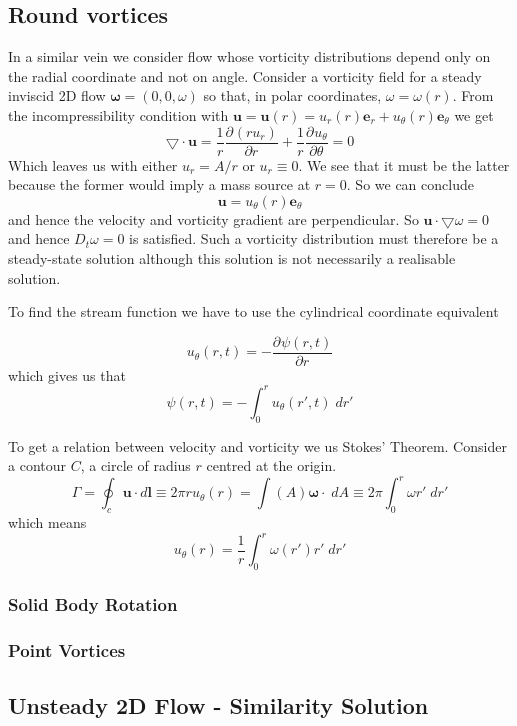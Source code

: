 \documentclass[11pt]{article}
\newcommand*{\pd}[3][]{\ensuremath{\frac{\partial^{#1} {#2}}{\partial {#3}^{#1}}}}
\newcommand{\grad}{\bigtriangledown}
\newcommand{\mv}[1]{\bm{#1}}
\newenvironment{formula}
	{\begin{mdframed}[backgroundcolor=white, roundcorner=5pt, linewidth=1pt, linecolor=red]}
	{\end{mdframed}}
\begin{document}
\subsection{Round vortices}
In a similar vein we consider flow whose vorticity distributions depend only on the radial coordinate and not on angle.
Consider a vorticity field for a steady inviscid 2D flow $\mv{\omega}= (0, 0, \omega)$ so that, in polar coordinates, $\omega=\omega(r)$.
From the incompressibility condition with $\mv{u}=\mv{u}(r)=u_r(r)\mv{e}_r + u_\theta(r)\mv{e}_\theta$ we get
\[
	\grad\cdot\mv{u} = \frac{1}{r}\pd{(ru_r)}{r}+\frac{1}{r}\pd{u_\theta}{\theta}=0
\]
Which leaves us with either $u_r=A/r$ or $u_r\equiv 0$.
We see that it must be the latter because the former would imply a mass source at $r=0$.
So we can conclude
\[
	\mv{u} = u_\theta(r) \mv{e}_\theta
\]
and hence the velocity and vorticity gradient are perpendicular.
So $\mv{u}\cdot\grad\omega = 0$ and hence $D_t\omega = 0$ is satisfied.
Such a vorticity distribution must therefore be a steady-state solution although this solution is not necessarily a realisable solution.

To find the stream function we have to use the cylindrical coordinate equivalent
\begin{formula}
	\[
		u_\theta(r, t) = - \pd{\psi(r, t)}{r}
	\]
	which gives us that
	\[
		\psi(r, t) = - \int_0^r u_\theta(r', t) \;dr'
	\]
\end{formula}
To get a relation between velocity and vorticity we us Stokes' Theorem.
Consider a contour $C$, a circle of radius $r$ centred at the origin.
\[
	\Gamma = \oint_c \mv{u}\cdot d\mv{l} \equiv 2\pi r u_\theta (r) = \int(A) \mv{\omega}\cdot\mv{} \; dA \equiv 2\pi \int_0^r \omega r'\;dr'
\]
which means
\[
	u_\theta(r) = \frac{1}{r}\int_0^r \omega(r') r' \; dr'
\]
\subsubsection{Solid Body Rotation}
\subsubsection{Point Vortices}
\subsection{Unsteady 2D Flow - Similarity Solution}
\end{document}
